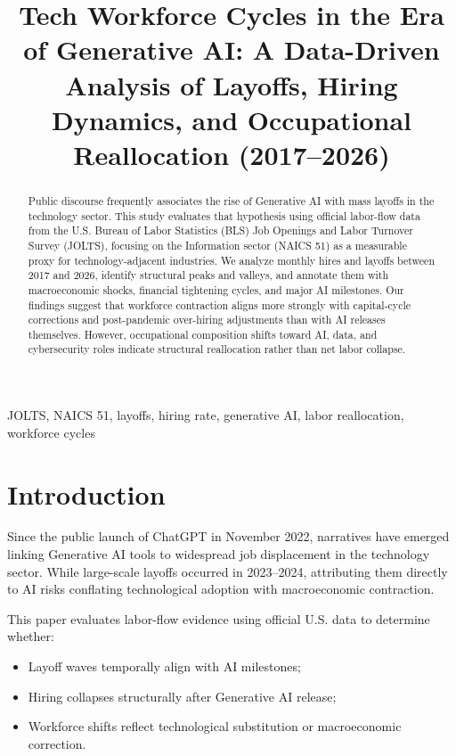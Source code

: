 \documentclass[conference]{IEEEtran}
\title{Tech Workforce Cycles in the Era of Generative AI:
A Data-Driven Analysis of Layoffs, Hiring Dynamics, and Occupational Reallocation (2017–2026)}
\author{
\IEEEauthorblockN{Seu Nome}
\IEEEauthorblockA{
Sua Instituição \\
Email: seu@email.com
}
}
\begin{document}
\maketitle

\begin{abstract}

Public discourse frequently associates the rise of Generative AI with mass layoffs in the technology sector. This study evaluates that hypothesis using official labor-flow data from the U.S. Bureau of Labor Statistics (BLS) Job Openings and Labor Turnover Survey (JOLTS), focusing on the Information sector (NAICS 51) as a measurable proxy for technology-adjacent industries. We analyze monthly hires and layoffs between 2017 and 2026, identify structural peaks and valleys, and annotate them with macroeconomic shocks, financial tightening cycles, and major AI milestones. Our findings suggest that workforce contraction aligns more strongly with capital-cycle corrections and post-pandemic over-hiring adjustments than with AI releases themselves. However, occupational composition shifts toward AI, data, and cybersecurity roles indicate structural reallocation rather than net labor collapse.

\end{abstract}

\begin{IEEEkeywords}
JOLTS, NAICS 51, layoffs, hiring rate, generative AI, labor reallocation, workforce cycles
\end{IEEEkeywords}

\section{Introduction}

Since the public launch of ChatGPT in November 2022, narratives have emerged linking Generative AI tools to widespread job displacement in the technology sector. While large-scale layoffs occurred in 2023–2024, attributing them directly to AI risks conflating technological adoption with macroeconomic contraction.

This paper evaluates labor-flow evidence using official U.S. data to determine whether:
\begin{itemize}
\item Layoff waves temporally align with AI milestones;
\item Hiring collapses structurally after Generative AI release;
\item Workforce shifts reflect technological substitution or macroeconomic correction.
\end{itemize}
\end{document}
